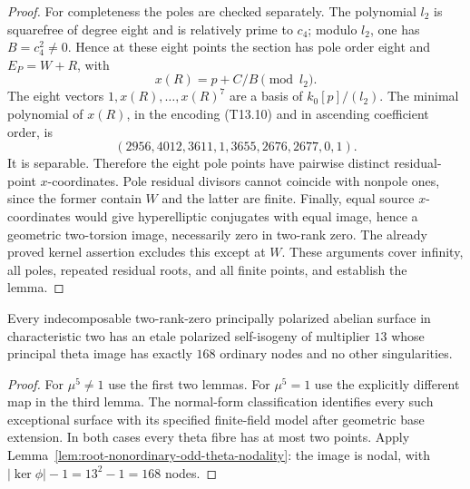 \begin{proof}
For completeness the poles are checked separately. The polynomial
$l_2$ is squarefree of degree eight and is relatively prime to
$c_4$; modulo $l_2$, one has $B=c_4^2\ne0$. Hence at these
eight points the section has pole order eight and $E_P=W+R$,
with
\[
                    x(R)=p+C/B\pmod {l_2}.
\tag{T13.19}
\]
The eight vectors $1,x(R),\ldots,x(R)^7$ are a basis of
$k_0[p]/(l_2)$. The minimal polynomial of $x(R)$, in the encoding
(T13.10) and in ascending coefficient order, is
\[
 (2956,4012,3611,1,3655,2676,2677,0,1).
\tag{T13.20}
\]
It is separable. Therefore the eight pole points have pairwise
distinct residual-point $x$-coordinates. Pole residual divisors
cannot coincide with nonpole ones, since the former contain $W$
and the latter are finite. Finally, equal source $x$-coordinates
would give hyperelliptic conjugates with equal image, hence a
geometric two-torsion image, necessarily zero in two-rank zero.
The already proved kernel assertion excludes this except at $W$.
These arguments cover infinity, all poles, repeated residual roots,
and all finite points, and establish the lemma.
\end{proof}

\begin{theorem}
\label{thm:uniform-thirteen-nodal-self-isogeny-candidate}
Every indecomposable two-rank-zero principally polarized abelian surface
in characteristic two has an etale polarized self-isogeny of multiplier
$13$ whose principal theta image has exactly $168$ ordinary nodes
and no other singularities.
\end{theorem}
\begin{proof}
For $\mu^5\ne1$ use the first two lemmas. For $\mu^5=1$ use
the explicitly different map in the third lemma. The normal-form
classification identifies every such exceptional surface with its
specified finite-field model after geometric base extension.
In both cases every theta fibre has at most two points. Apply
Lemma~\ref{lem:root-nonordinary-odd-theta-nodality}: the image is
nodal, with $|\ker\phi|-1=13^2-1=168$ nodes.
\end{proof}

